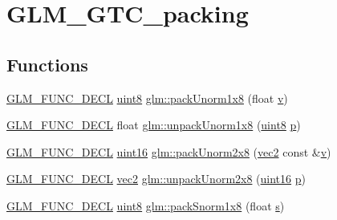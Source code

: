 \hypertarget{group__gtc__packing}{}\section{G\+L\+M\+\_\+\+G\+T\+C\+\_\+packing}
\label{group__gtc__packing}
\subsection*{Functions}
\begin{DoxyCompactItemize}
\item 
\hyperlink{setup_8hpp_ab2d052de21a70539923e9bcbf6e83a51}{G\+L\+M\+\_\+\+F\+U\+N\+C\+\_\+\+D\+E\+CL} \hyperlink{group__gtc__type__precision_ga1a7dcd8aac97cc8020817c94049deff2}{uint8} \hyperlink{group__gtc__packing_ga2f9963e5d762b10085b280d3662017ba}{glm\+::pack\+Unorm1x8} (float \hyperlink{_s_d_l__opengl_8h_a10a82eabcb59d2fcd74acee063775f90}{v})
\item 
\hyperlink{setup_8hpp_ab2d052de21a70539923e9bcbf6e83a51}{G\+L\+M\+\_\+\+F\+U\+N\+C\+\_\+\+D\+E\+CL} float \hyperlink{group__gtc__packing_ga32f3f2642df2ea87449d59fb614a8305}{glm\+::unpack\+Unorm1x8} (\hyperlink{group__gtc__type__precision_ga1a7dcd8aac97cc8020817c94049deff2}{uint8} \hyperlink{_s_d_l__opengl__glext_8h_aa5367c14d90f462230c2611b81b41d23}{p})
\item 
\hyperlink{setup_8hpp_ab2d052de21a70539923e9bcbf6e83a51}{G\+L\+M\+\_\+\+F\+U\+N\+C\+\_\+\+D\+E\+CL} \hyperlink{group__gtc__type__precision_gad8c2939e1fdd8e5828b31d95c52255d5}{uint16} \hyperlink{group__gtc__packing_ga833288fc0d4a79f19d0db75a6843bfe6}{glm\+::pack\+Unorm2x8} (\hyperlink{group__core__types_gaa1618f51db67eaa145db101d8c8431d8}{vec2} const \&\hyperlink{_s_d_l__opengl_8h_a10a82eabcb59d2fcd74acee063775f90}{v})
\item 
\hyperlink{setup_8hpp_ab2d052de21a70539923e9bcbf6e83a51}{G\+L\+M\+\_\+\+F\+U\+N\+C\+\_\+\+D\+E\+CL} \hyperlink{group__core__types_gaa1618f51db67eaa145db101d8c8431d8}{vec2} \hyperlink{group__gtc__packing_ga96ce0c24339ee676e28a027fffd1edf6}{glm\+::unpack\+Unorm2x8} (\hyperlink{group__gtc__type__precision_gad8c2939e1fdd8e5828b31d95c52255d5}{uint16} \hyperlink{_s_d_l__opengl__glext_8h_aa5367c14d90f462230c2611b81b41d23}{p})
\item 
\hyperlink{setup_8hpp_ab2d052de21a70539923e9bcbf6e83a51}{G\+L\+M\+\_\+\+F\+U\+N\+C\+\_\+\+D\+E\+CL} \hyperlink{group__gtc__type__precision_ga1a7dcd8aac97cc8020817c94049deff2}{uint8} \hyperlink{group__gtc__packing_ga26b6cd7a35c46c4b6a342f3b97b47423}{glm\+::pack\+Snorm1x8} (float \hyperlink{_s_d_l__opengl_8h_a4af680a6c683f88ed67b76f207f2e6e4}{s})

\end{DoxyCompactItemize}
